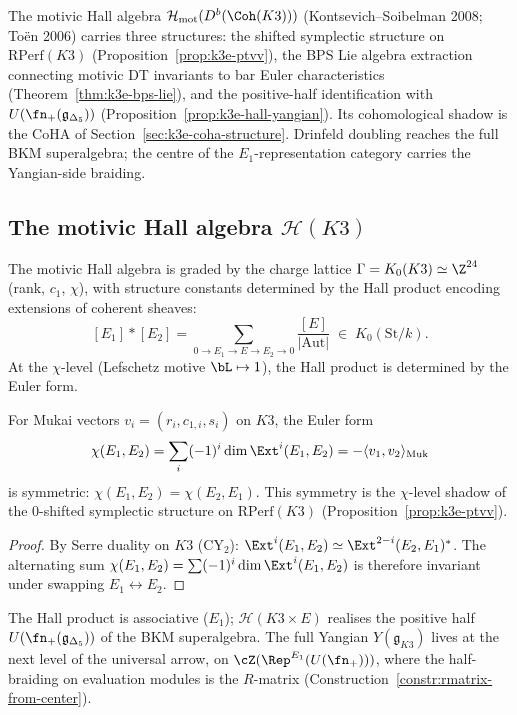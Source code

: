 The motivic Hall algebra $\mathcal{H}_{\mathrm{mot}}(D^b(\Coh(K3)))$ (Kontsevich--Soibelman 2008; To\"en 2006) carries three structures: the shifted symplectic structure on $\mathrm{RPerf}(K3)$ (Proposition~\ref{prop:k3e-ptvv}), the BPS Lie algebra extraction connecting motivic DT invariants to bar Euler characteristics (Theorem~\ref{thm:k3e-bps-lie}), and the positive-half identification with $U(\fn_+(\mathfrak{g}_{\Delta_5}))$ (Proposition~\ref{prop:k3e-hall-yangian}). Its cohomological shadow is the CoHA of Section~\ref{sec:k3e-coha-structure}. Drinfeld doubling reaches the full BKM superalgebra; the centre of the $E_1$-representation category carries the Yangian-side braiding.

\subsection{The motivic Hall algebra \texorpdfstring{$\mathcal{H}(K3)$}{H(K3)}}
\label{subsec:k3e-hall-algebra}

The motivic Hall algebra is graded by the charge lattice $\Gamma = K_0(K3) \simeq \Z^{24}$ (rank, $c_1$, $\chi$), with structure constants determined by the Hall product encoding extensions of coherent sheaves:
\[
 [E_1] * [E_2]
 = \sum_{0 \to E_1 \to E \to E_2 \to 0} \frac{[E]}{|\mathrm{Aut}|}
 \;\in\; K_0(\mathrm{St}/k).
\]
At the $\chi$-level (Lefschetz motive $\bL \mapsto 1$), the Hall product is determined by the Euler form.

\begin{proposition}
\label{prop:k3e-euler-form}
For Mukai vectors $v_i = (r_i, c_{1,i}, s_i)$ on $K3$, the Euler form
\[
 \chi(E_1, E_2)
 = \sum_i (-1)^i \dim \Ext^i(E_1, E_2)
 = -\langle v_1, v_2 \rangle_{\mathrm{Muk}}
\]
is symmetric: $\chi(E_1, E_2) = \chi(E_2, E_1)$. This symmetry is the $\chi$-level shadow of the $0$-shifted symplectic structure on $\mathrm{RPerf}(K3)$ (Proposition~\ref{prop:k3e-ptvv}).
\end{proposition}

\begin{proof}
By Serre duality on $K3$ (CY$_2$): $\Ext^i(E_1, E_2) \simeq \Ext^{2-i}(E_2, E_1)^*$. The alternating sum $\chi(E_1, E_2) = \sum (-1)^i \dim \Ext^i(E_1, E_2)$ is therefore invariant under swapping $E_1 \leftrightarrow E_2$.
\end{proof}

\begin{remark}
\label{rem:k3e-hall-e1}
The Hall product is associative ($E_1$); $\mathcal{H}(K3 \times E)$ realises the positive half $U(\fn_+(\mathfrak{g}_{\Delta_5}))$ of the BKM superalgebra. The full Yangian $Y(\mathfrak{g}_{K3})$ lives at the next level of the universal arrow, on $\cZ(\Rep^{E_1}(U(\fn_+)))$, where the half-braiding on evaluation modules is the $R$-matrix (Construction~\ref{constr:rmatrix-from-center}).
\end{remark}

